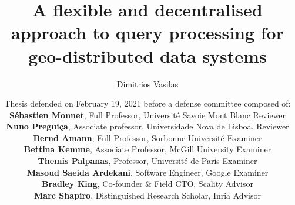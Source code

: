 \documentclass[aspectratio=169]{beamer}
\title{A flexible and decentralised approach to query processing for geo-distributed data systems}
\author{\normalsize Dimitrios Vasilas}
\date{\scriptsize{Thesis defended on February 19, 2021 before a defense committee composed of: \\ \medskip
\textbf{S{\'e}bastien Monnet}, Full Professor, Universit{\'e} Savoie Mont Blanc \hfill Reviewer \\
\textbf{Nuno Pregui\c{c}a}, Associate professor, Universidade Nova de Lisboa. \hfill Reviewer \\
\textbf{Bernd Amann}, Full Professor, Sorbonne Universit{\'e}  \hfill Examiner \\
\textbf{Bettina Kemme}, Associate Professor, McGill University \hfill Examiner \\
\textbf{Themis Palpanas}, Professor, Universit\'{e} de Paris \hfill Examiner \\
\textbf{Masoud Saeida Ardekani}, Software Engineer, Google \hfill Examiner \\
\textbf{Bradley King}, Co-founder \& Field CTO, Scality \hfill Advisor \\
\textbf{Marc Shapiro}, Distinguished Research Scholar, Inria \hfill Advisor \\
}
}
\begin{document}
\begin{frame}[plain]
\vspace{-1cm}
\titlepage
\end{frame}




\end{document}
